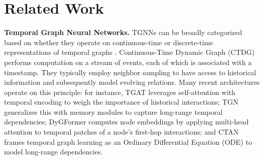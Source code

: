 

% 






\section{Related Work}
 \textbf{Temporal Graph Neural Networks.} TGNNs can be broadly categorized based on whether they operate on continuous-time or discrete-time representations of temporal graphs \citep{kazemi2020representation}. Continuous-Time Dynamic Graph (CTDG) performs computation on a stream of events, each of which is associated with a timestamp. They typically employ neighbor sampling to have access to historical information and subsequently model evolving relations. Many recent architectures operate on this principle: for instance, TGAT \citep{tgat} leverages self-attention with temporal encoding to weigh the importance of historical interactions; TGN \citep{tgn} generalizes this with memory modules to capture long-range temporal dependencies; DyGFormer \citep{dygformer} computes node embeddings by applying multi-head attention \citep{transformer} to temporal patches of a node's first-hop interactions; and CTAN \citep{ctan} frames temporal graph learning as an Ordinary Differential Equation (ODE) to model long-range dependencies.

